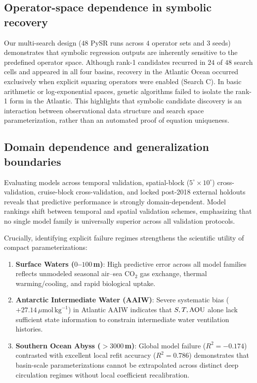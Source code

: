 \subsection{Operator-space dependence in symbolic recovery}
Our multi-search design ($48$ PySR runs across $4$ operator sets and $3$ seeds) demonstrates that symbolic regression outputs are inherently sensitive to the predefined operator space. Although rank-1 candidates recurred in $24$ of $48$ search cells and appeared in all four basins, recovery in the Atlantic Ocean occurred exclusively when explicit squaring operators were enabled (Search C). In basic arithmetic or log-exponential spaces, genetic algorithms failed to isolate the rank-1 form in the Atlantic. This highlights that symbolic candidate discovery is an interaction between observational data structure and search space parameterization, rather than an automated proof of equation uniqueness.

\subsection{Domain dependence and generalization boundaries}
Evaluating models across temporal validation, spatial-block ($5^\circ \times 10^\circ$) cross-validation, cruise-block cross-validation, and locked post-2018 external holdouts reveals that predictive performance is strongly domain-dependent. Model rankings shift between temporal and spatial validation schemes, emphasizing that no single model family is universally superior across all validation protocols.

Crucially, identifying explicit failure regimes strengthens the scientific utility of compact parameterizations:
\begin{enumerate}[label=(\roman*)]
\item \textbf{Surface Waters ($0$--$100$\,m)}: High predictive error across all model families reflects unmodeled seasonal air--sea $\mathrm{CO}_2$ gas exchange, thermal warming/cooling, and rapid biological uptake.
\item \textbf{Antarctic Intermediate Water (AAIW)}: Severe systematic bias ($+27.14\,\mu\mathrm{mol}\,\mathrm{kg}^{-1}$) in Atlantic AAIW indicates that $S, T, \mathrm{AOU}$ alone lack sufficient state information to constrain intermediate water ventilation histories.
\item \textbf{Southern Ocean Abyss ($>3000$\,m)}: Global model failure ($R^2 = -0.174$) contrasted with excellent local refit accuracy ($R^2 = 0.786$) demonstrates that basin-scale parameterizations cannot be extrapolated across distinct deep circulation regimes without local coefficient recalibration.
\end{enumerate}


